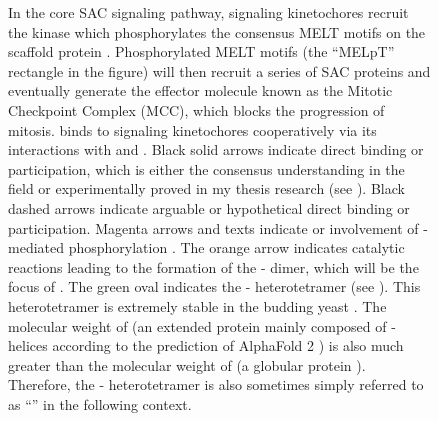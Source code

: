 \begin{figure}
    \noindent\justifying In the core SAC signaling pathway, signaling kinetochores recruit the kinase  which phosphorylates the consensus MELT motifs on the scaffold protein . Phosphorylated MELT motifs (the ``MELpT'' rectangle in the figure) will then recruit a series of SAC proteins and eventually generate the effector molecule known as the Mitotic Checkpoint Complex (MCC), which blocks the progression of mitosis.  binds to signaling kinetochores cooperatively via its interactions with  and  \cite{BUB1-CDC20-MAD1, Tripartite}. Black solid arrows indicate direct binding or participation, which is either the consensus understanding in the field \cite{MPS1Localization_Ji, MPS1Localization_Hiruma, RecombinantKNL1, MELTActivity, BubBiochem, BubR1TwoPools, BUB1CD1-MAD1CStructure, Faesen2017, BUB1-CDC20-MAD1, Tripartite} or experimentally proved in my thesis research (see ). Black dashed arrows indicate arguable \cite{BubBiochem, BubR1TwoPools} or hypothetical direct binding or participation. Magenta arrows and texts indicate  or involvement of -mediated phosphorylation \cite{Ji2017eLife}. The orange arrow indicates catalytic reactions leading to the formation of the - dimer, which will be the focus of . The green  oval indicates the - heterotetramer (see ). This heterotetramer is extremely stable in the budding yeast \cite{StableHeterotetramer}. The molecular weight of  (an extended protein mainly composed of \textalpha{}-helices according to the prediction of AlphaFold 2 \cite{AlphaFold, UniProtAlphaFold}) is also much greater than the molecular weight of  (a globular protein \cite{Structure1GO4}). Therefore, the - heterotetramer is also sometimes simply referred to as ``'' in the following context.
    \label{CoreSAC}
\end{figure}

